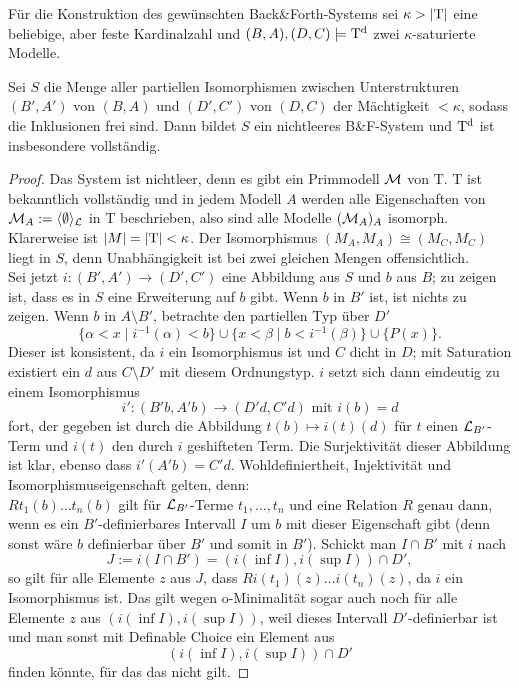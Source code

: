 \newpage
Für die Konstruktion des gewünschten Back\&Forth-Systems sei $\kappa>{\left| \operatorname{T} \right|}$ eine beliebige, aber feste Kardinalzahl und $(B,A),(D,C)\models\operatorname{T^d}$ zwei $\kappa$-saturierte Modelle.
\begin{theorem}\label{BackForth}
	Sei $S$ die Menge aller partiellen Isomorphismen zwischen Unterstrukturen $(B',A')$ von $(B,A)$ und $(D',C')$ von $(D,C)$ der Mächtigkeit $<\kappa$, sodass die Inklusionen frei sind. Dann bildet $S$ ein nichtleeres B\&F-System und $\operatorname{T^d}$ ist insbesondere vollständig.
\end{theorem}
\begin{proof}
	Das System ist nichtleer, denn es gibt ein Primmodell $\mathcal{M}$ von T. T ist bekanntlich vollständig und in jedem Modell $A$ werden alle Eigenschaften von $\mathcal{M}_A:=\langle\emptyset\rangle_{\mathcal{L}}$ in T beschrieben, also sind alle Modelle $(\mathcal{M}_A)_A$ isomorph. Klarerweise ist ${\left| M \right|}={\left| \operatorname{T} \right|}<\kappa$. Der Isomorphismus $(M_A,M_A)\cong(M_C,M_C)$ liegt in $S$, denn Unabhängigkeit ist bei zwei gleichen Mengen offensichtlich.\\
	Sei jetzt $i:(B',A')\rightarrow(D',C')$ eine Abbildung aus $S$ und $b$ aus $B$; zu zeigen ist, dass es in $S$ eine Erweiterung auf $b$ gibt. Wenn $b$ in $B'$ ist, ist nichts zu zeigen. Wenn $b$ in $A\setminus B'$, betrachte den partiellen Typ über $D'$ $$\{\alpha<x\mid i^{-1}(\alpha)<b\}\cup\{x<\beta\mid b<i^{-1}(\beta)\}\cup\{P(x)\}.$$
	Dieser ist konsistent, da $i$ ein Isomorphismus ist und $C$ dicht in $D$; mit Saturation existiert ein $d$ aus $C\setminus D'$ mit diesem Ordnungstyp. $i$ setzt sich dann eindeutig zu einem Isomorphismus $$i':(B'b,A'b)\rightarrow(D'd,C'd)\text{ mit }i(b)=d$$ fort, der gegeben ist durch die Abbildung $t(b)\mapsto i(t)(d)$ für $t$ einen $\mathcal{L}_{B'}$-Term und $i(t)$ den durch $i$ geshifteten Term. Die Surjektivität dieser Abbildung ist klar, ebenso dass $i'(A'b)=C'd$. Wohldefiniertheit, Injektivität und Isomorphismuseigenschaft gelten, denn:\\
	$Rt_1(b)\dots t_n(b)$ gilt für $\mathcal{L}_{B'}$-Terme $t_1,\dots,t_n$ und eine Relation $R$ genau dann, wenn es ein $B'$-definierbares Intervall $I$ um $b$ mit dieser Eigenschaft gibt (denn sonst wäre $b$ definierbar über $B'$ und somit in $B'$). Schickt man $I\cap B'$ mit $i$ nach $$J:=i(I\cap B')=(i(\inf I),i(\sup I))\cap D',$$ so gilt für alle Elemente $z$ aus $J$, dass $Ri(t_1)(z)\dots i(t_n)(z)$, da $i$ ein Isomorphismus ist. Das gilt wegen o-Minimalität sogar auch noch für alle Elemente $z$ aus $(i(\inf I),i(\sup I))$, weil dieses Intervall $D'$-definierbar ist und man sonst mit Definable Choice ein Element aus $$(i(\inf I),i(\sup I))\cap D'$$ finden könnte, für das das nicht gilt.

\end{proof}
